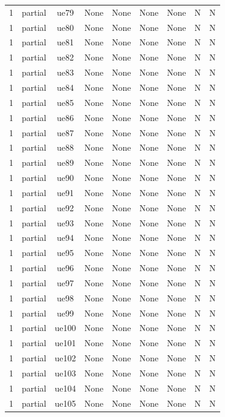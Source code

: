 \begin{table}[ht]
\begin{tabular}{|c|c|c|c|c|c|c|c|c|}
1 & partial & ue79 & None & None & None & None & N & N \\
1 & partial & ue80 & None & None & None & None & N & N \\
1 & partial & ue81 & None & None & None & None & N & N \\
1 & partial & ue82 & None & None & None & None & N & N \\
1 & partial & ue83 & None & None & None & None & N & N \\
1 & partial & ue84 & None & None & None & None & N & N \\
1 & partial & ue85 & None & None & None & None & N & N \\
1 & partial & ue86 & None & None & None & None & N & N \\
1 & partial & ue87 & None & None & None & None & N & N \\
1 & partial & ue88 & None & None & None & None & N & N \\
1 & partial & ue89 & None & None & None & None & N & N \\
1 & partial & ue90 & None & None & None & None & N & N \\
1 & partial & ue91 & None & None & None & None & N & N \\
1 & partial & ue92 & None & None & None & None & N & N \\
1 & partial & ue93 & None & None & None & None & N & N \\
1 & partial & ue94 & None & None & None & None & N & N \\
1 & partial & ue95 & None & None & None & None & N & N \\
1 & partial & ue96 & None & None & None & None & N & N \\
1 & partial & ue97 & None & None & None & None & N & N \\
1 & partial & ue98 & None & None & None & None & N & N \\
1 & partial & ue99 & None & None & None & None & N & N \\
1 & partial & ue100 & None & None & None & None & N & N \\
1 & partial & ue101 & None & None & None & None & N & N \\
1 & partial & ue102 & None & None & None & None & N & N \\
1 & partial & ue103 & None & None & None & None & N & N \\
1 & partial & ue104 & None & None & None & None & N & N \\
1 & partial & ue105 & None & None & None & None & N & N \\

\end{tabular}
\end{table}

